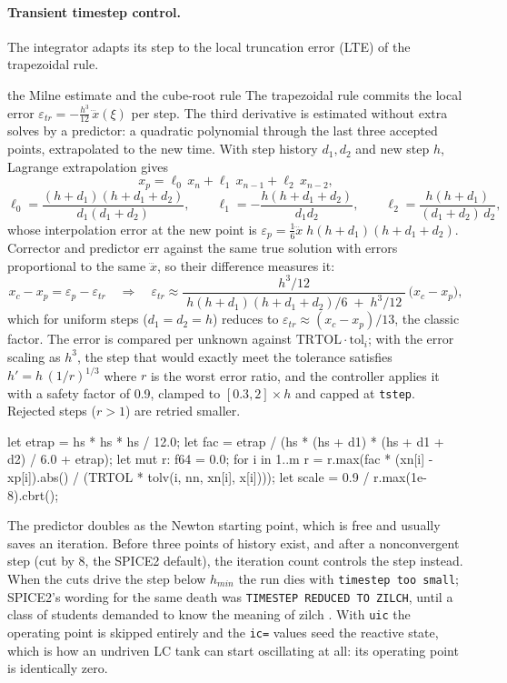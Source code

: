 \documentclass[11pt]{article}
\begin{document}
\paragraph{Transient timestep control.}
The integrator adapts its step to the local truncation error (LTE) of the
trapezoidal rule.

\begin{derivation}{the Milne estimate and the cube-root rule}
The trapezoidal rule commits the local error
$\varepsilon_{tr} = -\tfrac{h^3}{12}\, \dddot{x}(\xi)$ per step. The
third derivative is estimated without extra solves by a predictor: a quadratic
polynomial through the last three accepted points, extrapolated to the
new time. With step history $d_1, d_2$ and new step $h$, Lagrange
extrapolation gives
\[
x_p = \ell_0\, x_n + \ell_1\, x_{n-1} + \ell_2\, x_{n-2},
\]
\[
\ell_0 = \frac{(h + d_1)(h + d_1 + d_2)}{d_1 (d_1 + d_2)}, \qquad
\ell_1 = -\frac{h (h + d_1 + d_2)}{d_1 d_2}, \qquad
\ell_2 = \frac{h (h + d_1)}{(d_1 + d_2)\, d_2},
\]
whose interpolation error at the new point is
$\varepsilon_p = \tfrac{1}{6} \dddot{x}\; h (h + d_1)(h + d_1 + d_2)$.
Corrector and predictor err against the same true solution with errors
proportional to the same $\dddot{x}$, so their difference measures it:
\[
x_c - x_p = \varepsilon_p - \varepsilon_{tr}
\quad\Longrightarrow\quad
\varepsilon_{tr} \approx
\frac{h^3/12}{\;h(h+d_1)(h+d_1+d_2)/6 \;+\; h^3/12\;}\,\bigl(x_c - x_p\bigr),
\]
which for uniform steps ($d_1 = d_2 = h$) reduces to
$\varepsilon_{tr} \approx (x_c - x_p)/13$, the classic factor. The error
is compared per unknown against $\text{TRTOL}\cdot\text{tol}_i$; with the
error scaling as $h^3$, the step that would exactly meet the tolerance
satisfies $h' = h\, (1/r)^{1/3}$ where $r$ is the worst error ratio, and
the controller applies it with a safety factor of 0.9, clamped to
$[0.3, 2] \times h$ and capped at \texttt{tstep}. Rejected steps
($r > 1$) are retried smaller.
\end{derivation}

\begin{rust}
let etrap = hs * hs * hs / 12.0;
let fac = etrap / (hs * (hs + d1) * (hs + d1 + d2) / 6.0 + etrap);
let mut r: f64 = 0.0;
for i in 1..m {
    r = r.max(fac * (xn[i] - xp[i]).abs() / (TRTOL * tolv(i, nn, xn[i], x[i])));
}
let scale = 0.9 / r.max(1e-8).cbrt();
\end{rust}

The predictor doubles as the Newton starting point, which is free and
usually saves an iteration. Before three points of history exist, and
after a nonconvergent step (cut by 8, the SPICE2 default), the iteration
count controls the step instead. When the cuts drive the step below
$h_{min}$ the run dies with \texttt{timestep too small}; SPICE2's
wording for the same death was \texttt{TIMESTEP REDUCED TO ZILCH}, until
a class of students demanded to know the meaning of zilch
\cite{lifeofspice}. With \texttt{uic} the operating point is
skipped entirely and the \texttt{ic=} values seed the reactive state,
which is how an undriven LC tank can start oscillating at all: its
operating point is identically zero.
\end{document}
